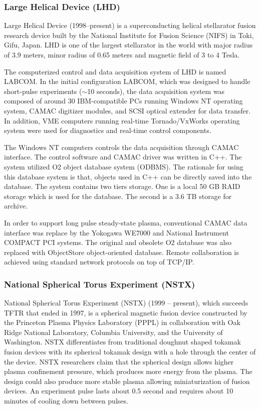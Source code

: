 \subsubsection{Large Helical Device (LHD)}

Large Helical Device\cite{iiyoshi1990design, iiyoshi1999overview} (1998--present) is a superconducting helical stellarator fusion research device built by the National Institute for Fusion Science (NIFS) in Toki, Gifu, Japan. LHD is one of the largest stellarator in the world with major radius of 3.9 meters, minor radius of 0.65 meters and magnetic field of 3 to 4 Tesla\cite{iiyoshi1999overview}.

The computerized control and data acquisition system of LHD is named LABCOM. In the initial configuration LABCOM\cite{nakanishi2000object}, which was designed to handle short-pulse experiments ($\sim$10 seconds), the data acquisition system was composed of around 30 IBM-compatible PCs running Windows NT operating system, CAMAC digitizer modules, and SCSI optical extender for data transfer. In addition, VME computers running real-time Tornado/VxWorks operating system were used for diagnostics and real-time control components.

The Windows NT computers controls the data acquisition through CAMAC interface. The control software and CAMAC driver was written in C++. The system utilized O2 object database system (ODBMS). The rationale for using this database system is that, objects used in C++ can be directly saved into the database. The system contains two tiers storage. One is a local 50 GB RAID storage which is used for the database. The second is a 3.6 TB storage for archive.

In order to support long pulse steady-state plasma, conventional CAMAC data interface was replace by the Yokogawa WE7000 and National Instrument COMPACT PCI systems. The original and obsolete O2 database was also replaced with ObjectStore object-oriented database\cite{hideya2003steady,sudo2006control,nagayama2008control}. Remote collaboration is achieved using standard network protocols on top of TCP/IP.


\subsubsection{National Spherical Torus Experiment (NSTX)}

National Spherical Torus Experiment (NSTX)\cite{ono2000exploration} (1999 -- present), which succeeds TFTR that ended in 1997, is a spherical magnetic fusion device constructed by the Princeton Plasma Physics Laboratory (PPPL) in collaboration with Oak Ridge National Laboratory, Columbia University, and the University of Washington. NSTX differentiates from traditional doughnut shaped tokamak fusion devices with its spherical tokamak design with a hole through the center of the device. NSTX researchers claim that the spherical design allows higher plasma confinement pressure, which produces more energy from the plasma. The design could also produce more stable plasma allowing miniaturization of fusion devices. An experiment pulse lasts about 0.5 second and requires about 10 minutes of cooling down between pulses\cite{sichta2001overview}.

